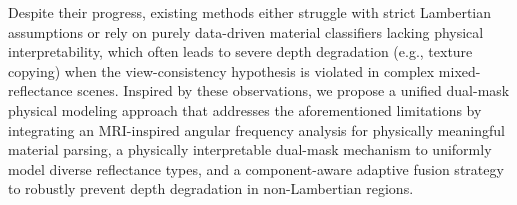 Despite their progress, existing methods either struggle with strict Lambertian assumptions or rely on purely data-driven material classifiers lacking physical interpretability, which often leads to severe depth degradation (e.g., texture copying) when the view-consistency hypothesis is violated in complex mixed-reflectance scenes. Inspired by these observations, we propose a unified dual-mask physical modeling approach that addresses the aforementioned limitations by integrating an MRI-inspired angular frequency analysis for physically meaningful material parsing, a physically interpretable dual-mask mechanism to uniformly model diverse reflectance types, and a component-aware adaptive fusion strategy to robustly prevent depth degradation in non-Lambertian regions.